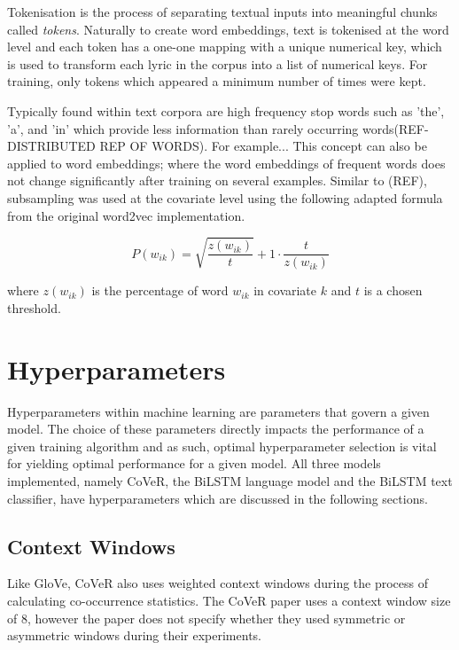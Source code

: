 \noindent
\newline
Tokenisation is the process of separating textual inputs into meaningful chunks called \textit{tokens}. Naturally to create word embeddings, text is tokenised at the word level and each token has a one-one mapping with a unique numerical key, which is used to transform each lyric in the corpus into a list of numerical keys. For training, only tokens which appeared a minimum number of times were kept.
 
\noindent
\newline
Typically found within text corpora are high frequency stop words such as 'the', 'a', and 'in' which provide less information than rarely occurring words(REF-DISTRIBUTED REP OF WORDS). For example... This concept can also be applied to word embeddings; where the word embeddings of frequent words does not change significantly after training on several examples. Similar to (REF), subsampling was used at the covariate level using the following adapted formula from the original word2vec implementation.

\begin{equation}
P(w_{ik}) = \sqrt{\dfrac{z(w_{ik})}{t}} + 1 \cdot \dfrac{t}{z(w_{ik})}
\end{equation}

\noindent
\newline
where \(z(w_{ik})\) is the percentage of word \(w_{ik}\) in covariate \(k\) and \(t\) is a chosen threshold.

\section{Hyperparameters}
Hyperparameters within machine learning are parameters that govern a given model. The choice of these parameters directly impacts the performance of a given training algorithm and as such, optimal hyperparameter selection is vital for yielding optimal performance for a given model. All three models implemented, namely CoVeR, the BiLSTM language model and the BiLSTM text classifier, have hyperparameters which are discussed in the following sections.
\subsection{Context Windows}
Like GloVe, CoVeR also uses weighted context windows during the process of calculating co-occurrence statistics. The CoVeR paper uses a context window size of 8, however the paper does not specify whether they used symmetric or asymmetric windows during their experiments.  
